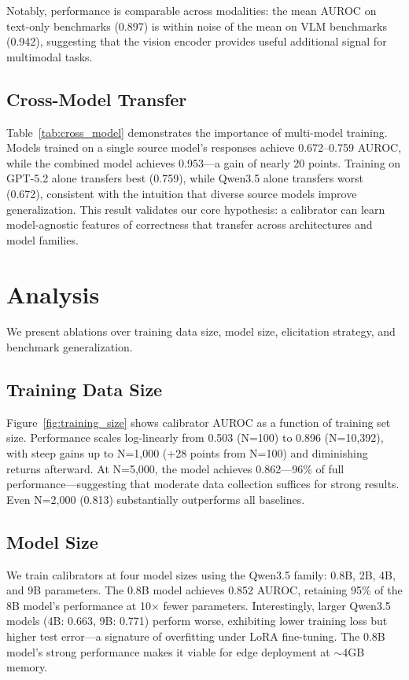 \documentclass{colm2026}
\begin{document}
Notably, performance is comparable across modalities: the mean AUROC on text-only benchmarks (0.897) is within noise of the mean on VLM benchmarks (0.942), suggesting that the vision encoder provides useful additional signal for multimodal tasks.

\subsection{Cross-Model Transfer}

Table~\ref{tab:cross_model} demonstrates the importance of multi-model training. Models trained on a single source model's responses achieve 0.672--0.759 AUROC, while the combined model achieves 0.953---a gain of nearly 20 points. Training on GPT-5.2 alone transfers best (0.759), while Qwen3.5 alone transfers worst (0.672), consistent with the intuition that diverse source models improve generalization. This result validates our core hypothesis: a calibrator can learn model-agnostic features of correctness that transfer across architectures and model families.

\section{Analysis}
\label{sec:analysis}

We present ablations over training data size, model size, elicitation strategy, and benchmark generalization.

\subsection{Training Data Size}

Figure~\ref{fig:training_size} shows calibrator AUROC as a function of training set size. Performance scales log-linearly from 0.503 (N=100) to 0.896 (N=10,392), with steep gains up to N=1,000 (+28 points from N=100) and diminishing returns afterward. At N=5,000, the model achieves 0.862---96\% of full performance---suggesting that moderate data collection suffices for strong results. Even N=2,000 (0.813) substantially outperforms all baselines.

\subsection{Model Size}

We train calibrators at four model sizes using the Qwen3.5 family: 0.8B, 2B, 4B, and 9B parameters. The 0.8B model achieves 0.852 AUROC, retaining 95\% of the 8B model's performance at 10$\times$ fewer parameters. Interestingly, larger Qwen3.5 models (4B: 0.663, 9B: 0.771) perform worse, exhibiting lower training loss but higher test error---a signature of overfitting under LoRA fine-tuning. The 0.8B model's strong performance makes it viable for edge deployment at ${\sim}$4GB memory.
\end{document}

